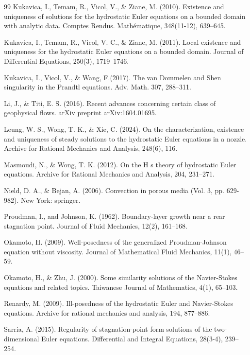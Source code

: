 \documentclass[12pt]{amsart}
\numberwithin{equation}{section}
\numberwithin{equation}{section}
\begin{document}
\begin{thebibliography}{99}
 Kukavica, I., Temam, R., Vicol, V., \& Ziane, M. (2010). Existence and uniqueness of solutions for the hydrostatic Euler equations on a bounded domain with analytic data. Comptes Rendus. Math\'{e}matique, 348(11-12), 639--645.

 Kukavica, I., Temam, R., Vicol, V. C., \& Ziane, M. (2011). Local existence and uniqueness for the hydrostatic Euler equations on a bounded domain. Journal of Differential Equations, 250(3), 1719--1746.

 {  Kukavica, I.,   Vicol, V.,  \& Wang, F.}(2017).  The van Dommelen and Shen singularity in the Prandtl equations. {  Adv.  Math.  } { 307},  288--311.


  Li, J., \& Titi, E. S. (2016). Recent advances concerning certain class of geophysical flows. arXiv preprint arXiv:1604.01695.

 Leung, W. S., Wong, T. K., \& Xie, C. (2024). On the characterization, existence and uniqueness of steady solutions to the hydrostatic Euler equations in a nozzle. Archive for Rational Mechanics and Analysis, 248(6), 116.

 Masmoudi, N., \& Wong, T. K. (2012). On the H s theory of hydrostatic Euler equations. Archive for Rational Mechanics and Analysis, 204, 231--271.

 Nield, D. A., \& Bejan, A. (2006). Convection in porous media (Vol. 3, pp. 629-982). New York: springer.

 Proudman, I., and Johnson, K. (1962). Boundary-layer growth near a rear stagnation point. Journal of Fluid Mechanics, 12(2), 161--168.
 
 
  Okamoto, H. (2009). Well-posedness of the generalized Proudman-Johnson equation without viscosity. Journal of Mathematical Fluid Mechanics, 11(1), 46--59.

  Okamoto, H., \& Zhu, J. (2000). Some similarity solutions of the Navier-Stokes equations and related topics. Taiwanese Journal of Mathematics, 4(1), 65--103.

 Renardy, M. (2009). Ill-posedness of the hydrostatic Euler and Navier-Stokes equations. Archive for rational mechanics and analysis, 194, 877--886.

  Sarria, A. (2015). Regularity of stagnation-point form solutions of the two-dimensional Euler equations. Differential and Integral Equations, 28(3-4), 239--254.
 

\end{thebibliography}
\end{document}
